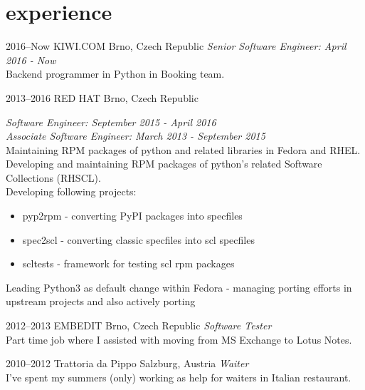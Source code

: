 \documentclass[]{friggeri-cv} %
\begin{document}

\section{experience}


\begin{entrylist}


\entry
{2016--Now}
{KIWI.COM}
{Brno, Czech Republic}
{\emph{Senior Software Engineer: April 2016 - Now} \\
Backend programmer in Python in Booking team.
}


\entry
{2013--2016}
{RED HAT}
{Brno, Czech Republic}
{\emph{Software Engineer: September 2015 - April 2016} \\
\emph{Associate Software Engineer: March 2013 - September 2015} \\
Maintaining RPM packages of python and related libraries 
in Fedora and RHEL.\\ Developing and maintaining RPM packages of python's related Software 
Collections (RHSCL). \\ Developing following projects:
\begin{itemize}
\item pyp2rpm - converting PyPI packages into specfiles
\item spec2scl - converting classic specfiles into scl specfiles
\item scltests - framework for testing scl rpm packages
\end{itemize}
Leading Python3 as default change within Fedora - managing porting efforts in upstream projects
and also actively porting}


\entry
{2012--2013}
{EMBEDIT}
{Brno, Czech Republic}
{\emph{Software Tester} \\ Part time job where I assisted with moving from MS Exchange to Lotus Notes.}

\entry
{2010--2012}
{Trattoria da Pippo}
{Salzburg, Austria}
{\emph{Waiter} \\ I've spent my summers (only) working as help for waiters in Italian restaurant.}
\end{entrylist}
\end{document}
